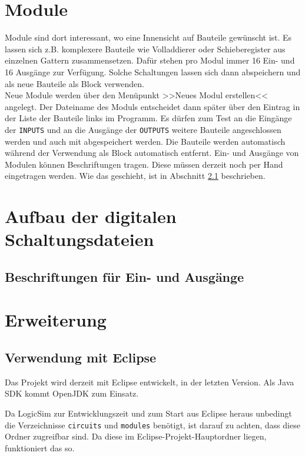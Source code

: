 \documentclass[12pt]{scrartcl}
\begin{document}
\section{Module}
Module sind dort interessant, wo eine Innensicht auf Bauteile gewünscht ist. Es lassen sich z.B. komplexere Bauteile wie Volladdierer oder Schieberegister aus einzelnen Gattern zusammensetzen. Dafür stehen pro Modul immer 16 Ein- und 16 Ausgänge zur Verfügung. Solche Schaltungen lassen sich dann abspeichern und als neue Bauteile als Block verwenden.\\

Neue Module werden über den Menüpunkt >>Neues Modul erstellen<< angelegt. Der Dateiname des Moduls entscheidet dann später über den Eintrag in der Liste der Bauteile links im Programm. Es dürfen zum Test an die Eingänge der \texttt{INPUTS} und an die Ausgänge der \texttt{OUTPUTS} weitere Bauteile angeschlossen werden und auch mit abgespeichert werden. Die Bauteile werden automatisch während der Verwendung als Block automatisch entfernt.
Ein- und Ausgänge von Modulen können Beschriftungen tragen. Diese müssen derzeit noch per Hand eingetragen werden. Wie das geschieht, ist in Abschnitt \ref{labels} beschrieben.

\section{Aufbau der digitalen Schaltungsdateien}
\subsection{Beschriftungen für Ein- und Ausgänge}
\label{labels}

\section{Erweiterung}

\subsection{Verwendung mit Eclipse}
Das Projekt wird derzeit mit Eclipse entwickelt, in der letzten Version. Als Java SDK kommt OpenJDK zum Einsatz.

Da LogicSim zur Entwicklungszeit und zum Start aus Eclipse heraus unbedingt die Verzeichnisse \texttt{circuits} und \texttt{modules} benötigt, ist darauf zu achten, dass diese Ordner zugreifbar sind. Da diese im Eclipse-Projekt-Hauptordner liegen, funktioniert das so.
\end{document}

